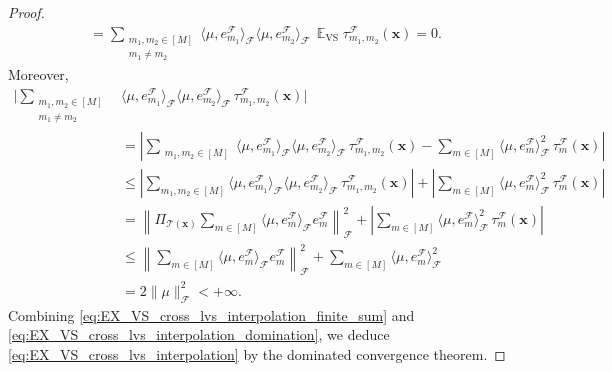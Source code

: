 \documentclass[twoside,11pt]{book}
\DeclareMathOperator{\VS}{\mathrm{VS}}
\DeclareMathOperator{\EX}{\mathbb{E}}
\DeclareMathOperator{\F}{\mathcal{F}}
\begin{document}
\begin{proof}
\begin{align}
& =  \sum\limits_{\substack{m_{1},m_{2} \in [M] \\ m_{1} \neq m_{2}}}  \langle \mu, e_{m_{1}}^{\F} \rangle_{\F} \langle \mu, e_{m_{2}}^{\F} \rangle_{\F} \,\EX_{\VS} \tau_{m_{1},m_{2}}^{\F}(\bm{x}) = 0.
\label{eq:EX_VS_cross_lvs_interpolation_finite_sum}
\end{align}
Moreover,
\begin{align}
\Bigg\vert\sum\limits_{\substack{m_{1},m_{2} \in [M] \\ m_{1} \neq m_{2}}}  &\langle \mu, e_{m_{1}}^{\F} \rangle_{\F} \langle \mu, e_{m_{2}}^{\F} \rangle_{\F} \,\tau_{m_{1},m_{2}}^{\F}(\bm{x})\Bigg\vert\nonumber \\
& = \left|\sum\limits_{\substack{m_{1},m_{2} \in [M]}}  \langle \mu, e_{m_{1}}^{\F} \rangle_{\F} \langle \mu, e_{m_{2}}^{\F} \rangle_{\F} \,\tau_{m_{1},m_{2}}^{\F}(\bm{x}) - \sum\limits_{m \in [M]} \langle \mu, e_{m}^{\F} \rangle_{\F}^{2} \,\tau_{m}^{\F}(\bm{x})\right|  \nonumber\\
 & \leq \left|\sum\limits_{m_{1},m_{2} \in [M]}  \langle \mu, e_{m_{1}}^{\F} \rangle_{\F} \langle \mu, e_{m_{2}}^{\F} \rangle_{\F} \,\tau_{m_{1},m_{2}}^{\F}(\bm{x})\right|
 +  \left|\sum\limits_{m \in [M]} \langle \mu, e_{m}^{\F} \rangle_{\F}^{2} \,\tau_{m}^{\F}(\bm{x})\right| \nonumber\\
& = \left\| \Pi_{\mathcal{T}(\bm{x})} \sum\limits_{m \in [M]} \langle \mu, e_{m}^{\F} \rangle_{\F} e_{m}^{\F}\right\|_{\F}^{2}  +  \left|\sum\limits_{m \in [M]} \langle \mu, e_{m}^{\F} \rangle_{\F}^{2} \,\tau_{m}^{\F}(\bm{x})\right| \nonumber\\
& \leq \left\|\sum\limits_{m \in [M]} \langle \mu, e_{m}^{\F} \rangle_{\F} e_{m}^{\F}\right\|_{\F}^{2}  +  \sum\limits_{m \in [M]} \langle \mu, e_{m}^{\F} \rangle_{\F}^{2} \nonumber \\
& = 2 \|\mu\|_{\F}^{2} < +\infty.
\label{eq:EX_VS_cross_lvs_interpolation_domination}
\end{align}
Combining \eqref{eq:EX_VS_cross_lvs_interpolation_finite_sum} and \eqref{eq:EX_VS_cross_lvs_interpolation_domination}, we deduce \eqref{eq:EX_VS_cross_lvs_interpolation} by the dominated convergence theorem.


\end{proof}
\end{document}
